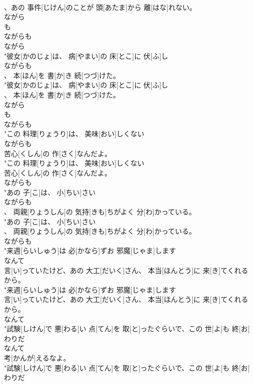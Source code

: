 \documentclass[8pt]{extreport}
\begin{document}
\begin{CJK}{UTF8}{min}
\\	、あの 事件[じけん]のことが 頭[あたま]から 離[はな]れない。
\\	ながら 
\\	も	
\\	ながらも
\\	ながら 
\\	"彼女[かのじょ]は、 病[やまい]の 床[とこ]に 伏[ふ]し
\\	ながらも
\\	、 本[ほん]を 書[か]き 続[つづ]けた。
\\	"彼女[かのじょ]は、 病[やまい]の 床[とこ]に 伏[ふ]し
\\	、 本[ほん]を 書[か]き 続[つづ]けた。
\\	ながら 
\\	も	
\\	ながらも
\\	"この 料理[りょうり]は、 美味[おい]しくない
\\	ながらも
\\	苦心[くしん]の 作[さく]なんだよ。
\\	"この 料理[りょうり]は、 美味[おい]しくない
\\	苦心[くしん]の 作[さく]なんだよ。
\\	ながらも
\\	"あの 子[こ]は、 小[ちい]さい
\\	ながらも
\\	、 両親[りょうしん]の 気持[きも]ちがよく 分[わ]かっている。
\\	"あの 子[こ]は、 小[ちい]さい
\\	、 両親[りょうしん]の 気持[きも]ちがよく 分[わ]かっている。
\\	ながらも
\\	"来週[らいしゅう]は 必[かなら]ずお 邪魔[じゃま]します
\\	なんて
\\	言[い]っていたけど、あの 大工[だいく]さん、 本当[ほんとう]に 来[き]てくれるから。
\\	"来週[らいしゅう]は 必[かなら]ずお 邪魔[じゃま]します
\\	言[い]っていたけど、あの 大工[だいく]さん、 本当[ほんとう]に 来[き]てくれるから。
\\	なんて
\\	"試験[しけん]で 悪[わる]い 点[てん]を 取[と]ったぐらいで、この 世[よ]も 終[お]わりだ
\\	なんて
\\	考[かんが]えるなよ。
\\	"試験[しけん]で 悪[わる]い 点[てん]を 取[と]ったぐらいで、この 世[よ]も 終[お]わりだ

\end{CJK}
\end{document}
